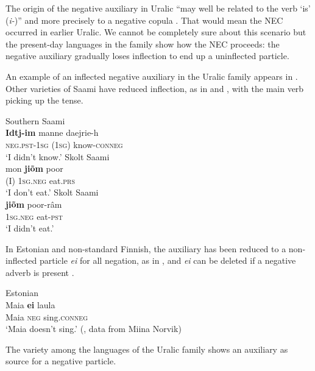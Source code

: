 \documentclass[output=paper,draft,draftmode,colorlinks,citecolor=brown]{langscibook}
\begin{document}
The origin of the negative auxiliary in Uralic ``may well be related to the
verb `is' (\textit{i-})'' \citep[594]{Simoncsics1998} and more precisely to
a negative copula \citep[173]{Honti1997-other}. That would mean the NEC occurred
in earlier Uralic. We cannot be completely sure about this scenario but
the present-day languages in the family show how the NEC proceeds: the
negative auxiliary gradually loses inflection to end up a uninflected
particle.

An example of an inflected negative auxiliary in the Uralic family appears
in . Other varieties of Saami have reduced
inflection, as in  and
, with the main verb picking up the tense.
%
\begin{exe}\ex\begin{xlist}
    \ex Southern Saami \label{ex:other-saami-know}\\
    \gll \textbf{Idtj-im} {\op}manne{\cp} daejrie-h \\
    \textsc{neg.pst-1sg}   (\textsc{1sg})    know-\textsc{conneg} \\
    \glt `I didn't know.' \citep[44]{Bergsland1994}
    \ex Skolt Saami \label{ex:other-saami-eat-prs}\\
    \gll {\op}mon{\cp}  \textbf{jiõm}    poor        \\
    (I)  \textsc{1sg.neg}    eat.\textsc{prs} \\
    \glt `I don't eat.' \parencite[355--6]{MiestamoKoponen2015}
    \ex Skolt Saami \label{ex:other-saami-eat-pst}\\
    \gll \textbf{jiõm}  poor-râm          \\
    \textsc{1sg.neg}  eat-\textsc{pst} \\
    \glt`I didn't eat.' \parencite[355--6]{MiestamoKoponen2015}
    \end{xlist}\end{exe}
%
In Estonian and non-standard Finnish, the
auxiliary has been reduced to a non-inflected particle \textit{ei} for all
negation, as in , and \textit{ei} can be deleted if a
negative adverb is present \parencite[see][164]{Honti1997-other}.
%
\begin{exe}\ex Estonian \label{ex:other-estonian}\\
    \gll Maia \textbf{ei}   laula      \\
    Maia \textsc{neg}   sing.\textsc{conneg} \\
    \glt `Maia doesn't sing.' (\citealt[151]{Veselinova2016}, data
    from Miina Norvik)
    \end{exe}
%
The variety among the languages of the Uralic family shows an auxiliary as
source for a negative particle.
\end{document}
